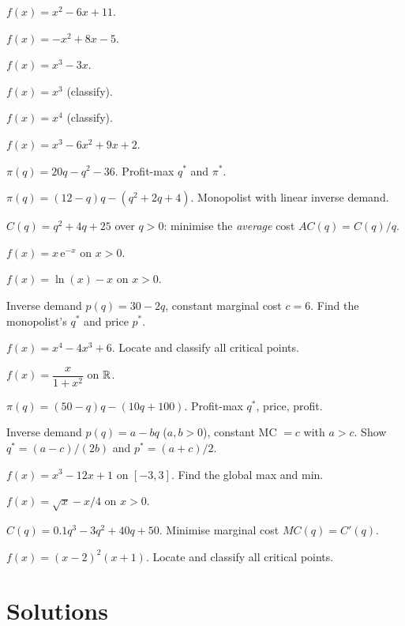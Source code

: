 \begin{problems}
    \item $f(x) = x^2 - 6 x + 11$.
    \item $f(x) = -x^2 + 8 x - 5$.
    \item $f(x) = x^3 - 3 x$.
    \item $f(x) = x^3$ (classify).
    \item $f(x) = x^4$ (classify).
    \item $f(x) = x^3 - 6 x^2 + 9 x + 2$.
    \item $\pi(q) = 20 q - q^2 - 36$. Profit-max $q^*$ and $\pi^*$.
    \item $\pi(q) = (12 - q) q - (q^2 + 2 q + 4)$. Monopolist with linear
          inverse demand.
    \item $C(q) = q^2 + 4 q + 25$ over $q > 0$: minimise the \emph{average}
          cost $AC(q) = C(q)/q$.
    \item $f(x) = x \, \mathrm{e}^{-x}$ on $x > 0$.
    \item $f(x) = \ln(x) - x$ on $x > 0$.
    \item Inverse demand $p(q) = 30 - 2 q$, constant marginal cost $c = 6$.
          Find the monopolist's $q^*$ and price $p^*$.
    \item $f(x) = x^4 - 4 x^3 + 6$. Locate and classify all critical
          points.
    \item $f(x) = \dfrac{x}{1 + x^2}$ on $\mathbb{R}$.
    \item $\pi(q) = (50 - q) q - (10 q + 100)$. Profit-max $q^*$, price,
          profit.
    \item Inverse demand $p(q) = a - b q$ ($a, b > 0$), constant MC $= c$
          with $a > c$. Show $q^* = (a - c)/(2 b)$ and $p^* = (a + c)/2$.
    \item $f(x) = x^3 - 12 x + 1$ on $[-3, 3]$. Find the global max and
          min.
    \item $f(x) = \sqrt{x} - x/4$ on $x > 0$.
    \item $C(q) = 0.1 q^3 - 3 q^2 + 40 q + 50$. Minimise marginal cost
          $MC(q) = C'(q)$.
    \item $f(x) = (x - 2)^2 (x + 1)$. Locate and classify all critical
          points.
\end{problems}

\section{Solutions}

